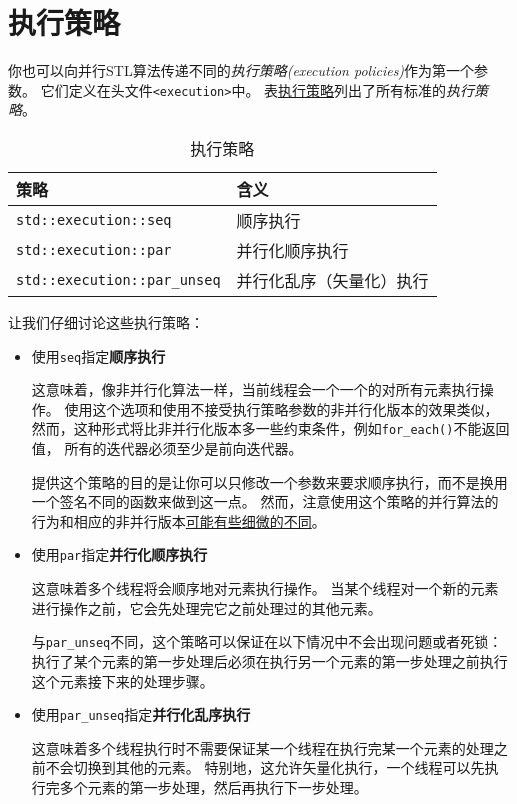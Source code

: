 \section{执行策略}\label{ch22.2}
你也可以向并行STL算法传递不同的\emph{执行策略(execution policies)}作为第一个参数。
它们定义在头文件\texttt{<execution>}中。
表\hyperref[t22.1]{执行策略}列出了所有标准的\emph{执行策略}。
\begin{table}[htb]
    \centering
    \begin{tabular}{l|l}
        \hline
        \textbf{策略}                         & \textbf{含义}  \\
        \hline
        \texttt{std::execution::seq}        & 顺序执行         \\
        \texttt{std::execution::par}        & 并行化顺序执行      \\
        \texttt{std::execution::par\_unseq} & 并行化乱序（矢量化）执行 \\
        \hline
    \end{tabular}
    \caption{执行策略}
    \label{t22.1}
\end{table}

让我们仔细讨论这些执行策略：
\begin{itemize}
    \item 使用\texttt{seq}指定\textbf{顺序执行}

    这意味着，像非并行化算法一样，当前线程会一个一个的对所有元素执行操作。
    使用这个选项和使用不接受执行策略参数的非并行化版本的效果类似，
    然而，这种形式将比非并行化版本多一些约束条件，例如\texttt{for\_each()}不能返回值，
    所有的迭代器必须至少是前向迭代器。

    提供这个策略的目的是让你可以只修改一个参数来要求顺序执行，而不是换用一个签名不同的函数来做到这一点。
    然而，注意使用这个策略的并行算法的行为和相应的非并行版本\hyperref[ch22.4]{可能有些细微的不同}。

    \item 使用\texttt{par}指定\textbf{并行化顺序执行}

    这意味着多个线程将会顺序地对元素执行操作。
    当某个线程对一个新的元素进行操作之前，它会先处理完它之前处理过的其他元素。

    与\texttt{par\_unseq}不同，这个策略可以保证在以下情况中不会出现问题或者死锁：
    执行了某个元素的第一步处理后必须在执行另一个元素的第一步处理之前执行这个元素接下来的处理步骤。
    \item 使用\texttt{par\_unseq}指定\textbf{并行化乱序执行}

    这意味着多个线程执行时不需要保证某一个线程在执行完某一个元素的处理之前不会切换到其他的元素。
    特别地，这允许矢量化执行，一个线程可以先执行完多个元素的第一步处理，然后再执行下一步处理。
\end{itemize}

